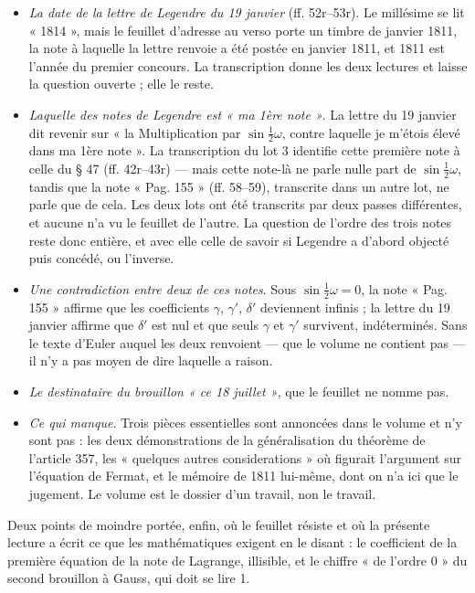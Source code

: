 \documentclass[11pt,a4paper]{article}
\begin{document}
\begin{itemize}
  \item \emph{La date de la lettre de Legendre du 19 janvier} (ff. 52r–53r).
    Le millésime se lit « 1814 », mais le feuillet d'adresse au verso porte un
    timbre de janvier 1811, la note à laquelle la lettre renvoie a été postée
    en janvier 1811, et 1811 est l'année du premier concours. La transcription
    donne les deux lectures et laisse la question ouverte ; elle le reste.
  \item \emph{Laquelle des notes de Legendre est « ma 1ère note »}. La lettre
    du 19 janvier dit revenir sur « la Multiplication par $\sin\frac12\omega$,
    contre laquelle je m'étois élevé dans ma 1ère note ». La transcription du
    lot 3 identifie cette première note à celle du § 47 (ff. 42r–43r) — mais
    cette note-là ne parle nulle part de $\sin\frac12\omega$, tandis que la
    note « Pag. 155 » (ff. 58–59), transcrite dans un autre lot, ne parle que
    de cela. Les deux lots ont été transcrits par deux passes différentes, et
    aucune n'a vu le feuillet de l'autre. La question de l'ordre des trois
    notes reste donc entière, et avec elle celle de savoir si Legendre a
    d'abord objecté puis concédé, ou l'inverse.
  \item \emph{Une contradiction entre deux de ces notes}. Sous
    $\sin\frac12\omega = 0$, la note « Pag. 155 » affirme que les coefficients
    $\gamma$, $\gamma'$, $\delta'$ deviennent infinis ; la lettre du 19 janvier
    affirme que $\delta'$ est nul et que seuls $\gamma$ et $\gamma'$
    survivent, indéterminés. Sans le texte d'Euler auquel les deux renvoient —
    que le volume ne contient pas — il n'y a pas moyen de dire laquelle a
    raison.
  \item \emph{Le destinataire du brouillon « ce 18 juillet »}, que le feuillet
    ne nomme pas.
  \item \emph{Ce qui manque}. Trois pièces essentielles sont annoncées dans le
    volume et n'y sont pas : les deux démonstrations de la généralisation du
    théorème de l'article 357, les « quelques autres considerations » où
    figurait l'argument sur l'équation de Fermat, et le mémoire de 1811
    lui-même, dont on n'a ici que le jugement. Le volume est le dossier d'un
    travail, non le travail.
\end{itemize}

Deux points de moindre portée, enfin, où le feuillet résiste et où la présente
lecture a écrit ce que les mathématiques exigent en le disant : le coefficient
de la première équation de la note de Lagrange, illisible, et le chiffre
« de l'ordre 0 » du second brouillon à Gauss, qui doit se lire 1.
\end{document}
